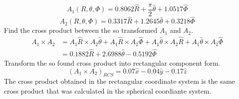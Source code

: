\documentclass[12pt]{article}
\begin{document}
$$ A_1(R,\theta,\Phi) = 0.8062\hat{R} + \frac{\pi}{2}\hat{\theta} + 1.0517\hat{\Phi}$$
$$ A_2(R,\theta,\Phi) = 0.3317\hat{R} + 1.2645\hat{\theta} + 0.3218\hat{\Phi}$$
Find the cross product between the so transformed $A_1$ and $A_2$. \\ 
\[
    \begin{aligned}
        A_1 \times A_2 &= A_1\hat{R} \times A_2\hat{\theta} + A_1\hat{R} \times A_2\hat{\Phi} + A_1\hat{\theta} \times A_2\hat{R} + A_1\hat{\theta} \times A_2\hat{\Phi} \\
        &= 0.1882\hat{R} + 2.6988\hat{\theta} - 0.5192\hat{\Phi}
    \end{aligned}    
\]
Transform the so found cross product into rectangular component form. \\
\[
    (A_1 \times A_2)_{RCS} = 0.07\hat{x} - 0.04\hat{y} - 0.17\hat{z}     
\]
The cross product obtained in the rectangular coordinate system is the same cross product that was calculated in the spherical coordiante system.
\end{document}

